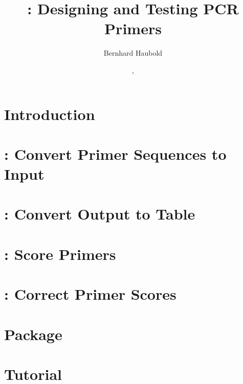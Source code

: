 \documentclass[a4paper]{report}
\begin{document}
\pagestyle{noweb}

\title{: Designing and Testing PCR Primers}
\author{Bernhard Haubold}
\date{\hspace{-0.11cm}, }
\maketitle

\tableofcontents

\chapter{Introduction}

\chapter{: Convert Primer Sequences to  Input}

\chapter{: Convert  Output to Table}

\chapter{: Score Primers}

\chapter{: Correct Primer Scores}

\chapter{Package }

\chapter{Tutorial}



\end{document}
